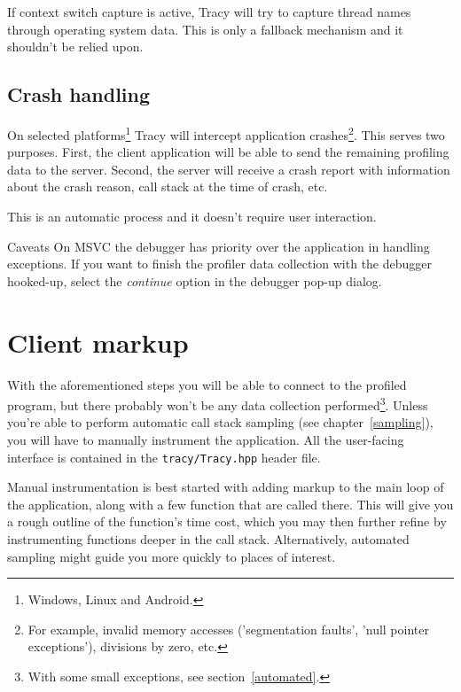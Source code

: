 \documentclass[hidelinks,titlepage,a4paper]{article}
\begin{document}
If context switch capture is active, Tracy will try to capture thread names through operating system data. This is only a fallback mechanism and it shouldn't be relied upon.

\subsection{Crash handling}
\label{crashhandling}

On selected platforms\footnote{Windows, Linux and Android.} Tracy will intercept application crashes\footnote{For example, invalid memory accesses ('segmentation faults', 'null pointer exceptions'), divisions by zero, etc.}. This serves two purposes. First, the client application will be able to send the remaining profiling data to the server. Second, the server will receive a crash report with information about the crash reason, call stack at the time of crash, etc.

This is an automatic process and it doesn't require user interaction.

\begin{bclogo}[
noborder=true,
couleur=black!5,
logo=\bcattention
]{Caveats}
On MSVC the debugger has priority over the application in handling exceptions. If you want to finish the profiler data collection with the debugger hooked-up, select the \emph{continue} option in the debugger pop-up dialog.
\end{bclogo}

\section{Client markup}
\label{client}

With the aforementioned steps you will be able to connect to the profiled program, but there probably won't be any data collection performed\footnote{With some small exceptions, see section~\ref{automated}.}. Unless you're able to perform automatic call stack sampling (see chapter~\ref{sampling}), you will have to manually instrument the application. All the user-facing interface is contained in the \texttt{tracy/Tracy.hpp} header file.

Manual instrumentation is best started with adding markup to the main loop of the application, along with a few function that are called there. This will give you a rough outline of the function's time cost, which you may then further refine by instrumenting functions deeper in the call stack. Alternatively, automated sampling might guide you more quickly to places of interest.
\end{document}
